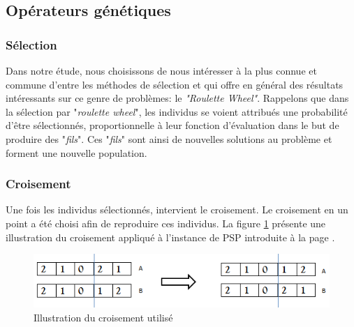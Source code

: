 	\subsection{Opérateurs génétiques}
		\subsubsection{Sélection}
		
		\hspace*{.5cm} Dans notre étude, nous choisissons de nous intéresser à la plus connue et commune d'entre les méthodes de sélection et qui offre en général des résultats intéressants sur ce genre de problèmes: le \emph{"Roulette Wheel"}. Rappelons que dans la sélection par "\emph{roulette wheel}", les individus se voient attribués une probabilité d'être sélectionnés, proportionnelle à leur fonction d'évaluation dans le but de produire des "\emph{fils}". Ces "\emph{fils}" sont ainsi de nouvelles solutions au problème et forment une nouvelle population.		
		
		\subsubsection{Croisement}
		
		Une fois les individus sélectionnés, intervient le croisement. Le croisement en un point a été choisi afin de reproduire ces individus. La figure \ref{fig:used_cross_over} présente une illustration du croisement appliqué à l'instance de PSP introduite à la page \pageref{sec:problem_description}.
		\begin{figure}[!h]
			\begin{center}
				\includegraphics[scale=.5]{images/cross_over_fig.png}
				\caption{Illustration du croisement utilisé}
				\label{fig:used_cross_over}
			\end{center}
		\end{figure}
		
